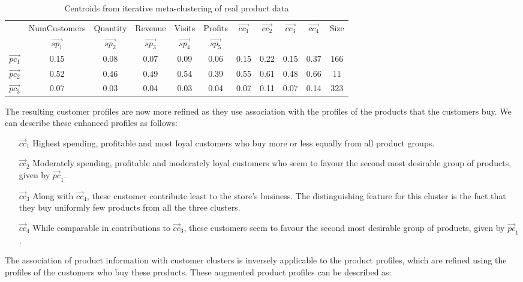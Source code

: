 \documentclass[oribibl]{llncs}
\begin{document}
\begin{table}[h]
	\caption{Centroids from iterative meta-clustering of real product data }
\centering
\small
{\setlength{\tabcolsep}{0.1cm}
\begin{tabular}{|c|c|c|c|c|c||c|c|c|c|c|}
\hline
  & NumCustomers & Quantity &  Revenue &    Visits &   Profits & $\vec{cc_1}$  &  $\vec{cc_2}$ &  $\vec{cc_3}$ & $\vec{cc_4}$&Size\\

  & \textbf{$\vec{sp_1}$}  &    \textbf{$\vec{sp_2}$}&  \textbf{$\vec{sp_3}$} &  \textbf{$\vec{sp_4}$}&  \textbf{$\vec{sp_5}$}&  & & & &\\
       \hline
\textbf{$\vec{pc_1}$} &  0.15  & 0.08  & 0.07  & 0.09 & 0.06  & 0.15 & 0.22 & 0.15 & 0.37 &166\\
  \hline
\textbf{$\vec{pc_2}$} &  0.52 & 0.46  & 0.49  & 0.54  & 0.39  & 0.55 & 0.61 & 0.48  & 0.66 &11\\
  \hline
\textbf{$\vec{pc_3}$} & 0.07 & 0.03  & 0.04 & 0.03  & 0.04  & 0.07  & 0.11 & 0.07  & 0.14 &323\\
  \hline
\end{tabular}}
\label{tab:realProductMetaCentroids} 
\end{table}

The resulting customer profiles are now more refined as they use association with
the profiles of the products that the customers buy. We can describe these
enhanced profiles as follows:

\begin{itemize}
\item [$\vec{cc}_1$] Highest spending, profitable and most loyal customers who buy more or less equally from all product groups.
\item [$\vec{cc}_2$] Moderately spending, profitable and moderately loyal customers who seem to favour the second most desirable group of products, given by $\vec{pc}_1$.
\item [$\vec{cc}_3$] Along with $\vec{cc}_4$, these customer contribute least to the store's business. The distinguishing feature for this cluster is the fact that they buy uniformly few products from all the three clusters.
\item [$\vec{cc}_4$] While comparable in contributions to $\vec{cc}_3$, these customers  seem to favour the second most desirable group of products, given by $\vec{pc}_1$.
\end{itemize}

The association of product information with customer clusters is inversely applicable to the product profiles,
which are refined using the profiles of the customers who buy these products.
These augmented product profiles can be described as:
\end{document}
